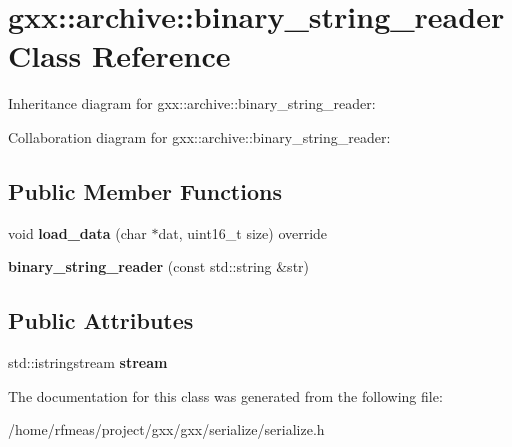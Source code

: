 \hypertarget{classgxx_1_1archive_1_1binary__string__reader}{}\section{gxx\+:\+:archive\+:\+:binary\+\_\+string\+\_\+reader Class Reference}
\label{classgxx_1_1archive_1_1binary__string__reader}


Inheritance diagram for gxx\+:\+:archive\+:\+:binary\+\_\+string\+\_\+reader\+:


Collaboration diagram for gxx\+:\+:archive\+:\+:binary\+\_\+string\+\_\+reader\+:
\subsection*{Public Member Functions}
\begin{DoxyCompactItemize}
\item 
void {\bfseries load\+\_\+data} (char $\ast$dat, uint16\+\_\+t size) override\hypertarget{classgxx_1_1archive_1_1binary__string__reader_a581a1363185e7720c1bce91a49af42fe}{}\label{classgxx_1_1archive_1_1binary__string__reader_a581a1363185e7720c1bce91a49af42fe}

\item 
{\bfseries binary\+\_\+string\+\_\+reader} (const std\+::string \&str)\hypertarget{classgxx_1_1archive_1_1binary__string__reader_a3b71d311c3be2e6d68ca09991425c420}{}\label{classgxx_1_1archive_1_1binary__string__reader_a3b71d311c3be2e6d68ca09991425c420}

\end{DoxyCompactItemize}
\subsection*{Public Attributes}
\begin{DoxyCompactItemize}
\item 
std\+::istringstream {\bfseries stream}\hypertarget{classgxx_1_1archive_1_1binary__string__reader_a91e8cf3dcd508ab78708594277da462e}{}\label{classgxx_1_1archive_1_1binary__string__reader_a91e8cf3dcd508ab78708594277da462e}

\end{DoxyCompactItemize}


The documentation for this class was generated from the following file\+:\begin{DoxyCompactItemize}
\item 
/home/rfmeas/project/gxx/gxx/serialize/serialize.\+h\end{DoxyCompactItemize}
